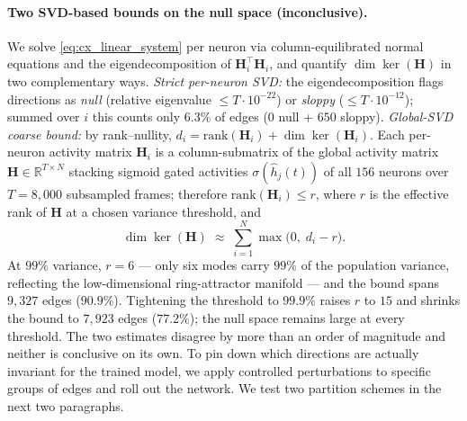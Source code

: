 \documentclass[11pt]{article}
\begin{document}
\paragraph{Two SVD-based bounds on the null space (inconclusive).}
We solve \cref{eq:cx_linear_system} per neuron via column-equilibrated normal equations and the eigendecomposition of $\mathbf{H}_i^{\top}\mathbf{H}_i$, and quantify $\dim\ker(\mathbf{H})$ in two complementary ways. \emph{Strict per-neuron SVD:} the eigendecomposition flags directions as \emph{null} (relative eigenvalue $\le T \cdot 10^{-22}$) or \emph{sloppy} ($\le T \cdot 10^{-12}$); summed over $i$ this counts only $6.3\%$ of edges ($0$ null + $650$ sloppy). \emph{Global-SVD coarse bound:} by rank--nullity, $d_i = \mathrm{rank}(\mathbf{H}_i) + \dim\ker(\mathbf{H}_i)$. Each per-neuron activity matrix $\mathbf{H}_i$ is a column-submatrix of the global activity matrix $\mathbf{H} \in \mathbb{R}^{T \times N}$ stacking sigmoid gated activities $\sigma(\hat h_j(t))$ of all $156$ neurons over $T = 8{,}000$ subsampled frames; therefore $\mathrm{rank}(\mathbf{H}_i) \le r$, where $r$ is the effective rank of $\mathbf{H}$ at a chosen variance threshold, and
\begin{equation}
\dim\ker(\mathbf{H}) \;\approx\; \sum_{i=1}^{N} \max\!\big(0,\; d_i - r\big).
\label{eq:cx_null_globalsvd}
\end{equation}
At $99\%$ variance, $r = 6$ --- only six modes carry $99\%$ of the population variance, reflecting the low-dimensional ring-attractor manifold --- and the bound spans $9{,}327$ edges ($90.9\%$). Tightening the threshold to $99.9\%$ raises $r$ to $15$ and shrinks the bound to $7{,}923$ edges ($77.2\%$); the null space remains large at every threshold. The two estimates disagree by more than an order of magnitude and neither is conclusive on its own. To pin down which directions are actually invariant for the trained model, we apply controlled perturbations to specific groups of edges and roll out the network. We test two partition schemes in the next two paragraphs.
\end{document}
